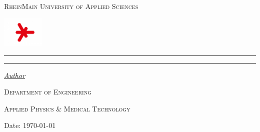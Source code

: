 \begin{titlepage}
	\newcommand{\HRule}{\rule{\linewidth}{0.5mm}}
	\centering
	\textsc{\Large RheinMain University of Applied Sciences} \par

	\begin{center}
		\includegraphics[width=0.15\textwidth]{logo-hsrm.jpg}
	\end{center}
	\textsc{\LARGE \titleLV}\vspace{0.5cm}
		\HRule\vspace{0.4cm}
	{\huge\bfseries \subtitleA}\par\vspace{0.4cm} %
	{\huge\bfseries \subtitleB}\par\vspace{0.4cm} %
		\HRule\vspace{1.5cm}
	\begin{minipage}{0.4\textwidth}
		\large
		\textit{\underline{Author}}\par\vspace{0.5cm}
		\textsc{\nameA}\par\vspace{0.5cm}
	\end{minipage}
	\vfill\vfill\vfill
	\textsc{\Large Department of Engineering}\par\vspace{0.5cm}\par
	\textsc{\large Applied Physics \& Medical Technology}\par\vspace{0.5cm}
	\vfill
	\begin{flushleft}
		Date:\hspace{0.4cm} {\large\today}
	\end{flushleft}
\end{titlepage}